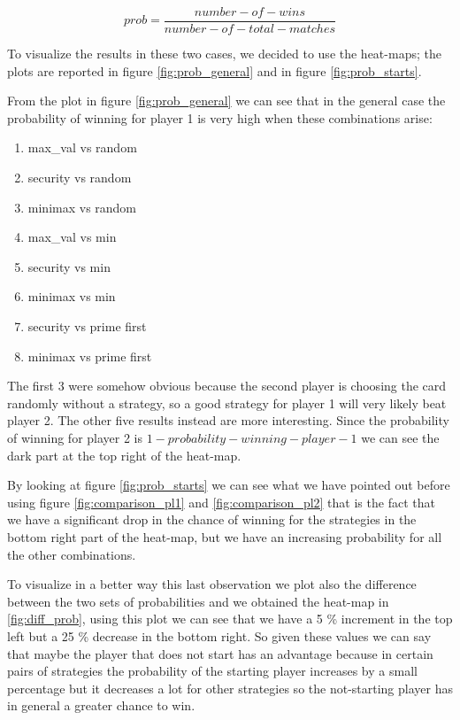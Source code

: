 \begin{equation} \label{eq:probability_cal}
    prob = \frac{number-of-wins}{number-of-total-matches}
\end{equation}

To visualize the results in these two cases, we decided to use the heat-maps; the plots are reported in figure \ref{fig:prob_general} and in figure \ref{fig:prob_starts}. 

From the plot in figure \ref{fig:prob_general} we can see that in the general case the probability of winning for player 1 is very high when these combinations arise:
\begin{enumerate}
    \item max\_val vs random
    \item security vs random
    \item minimax vs random
    \item max\_val vs min
    \item security vs min
    \item minimax vs min
    \item security vs prime first
    \item minimax vs prime first
\end{enumerate}
The first 3 were somehow obvious because the second player is choosing the card randomly without a strategy, so a good strategy for player 1 will very likely beat player 2. The other five results instead are more interesting. 
Since the probability of winning for player 2 is $1 - probability-winning-player-1$ we can see the dark part at the top right of the heat-map.

By looking at figure \ref{fig:prob_starts} we can see what we have pointed out before using figure \ref{fig:comparison_pl1} and \ref{fig:comparison_pl2} that is the fact that we have a significant drop in the chance of winning for the strategies in the bottom right part of the heat-map, but we have an increasing probability for all the other combinations.

To visualize in a better way this last observation we plot also the difference between the two sets of probabilities and we obtained the heat-map in \ref{fig:diff_prob}, using this plot we can see that we have a 5 \% increment in the top left but a 25 \% decrease in the bottom right. So given these values we can say that maybe the player that does not start has an advantage because in certain pairs of strategies the probability of the starting player increases by a small percentage but it decreases a lot for other strategies so the not-starting player has in general a greater chance to win.

